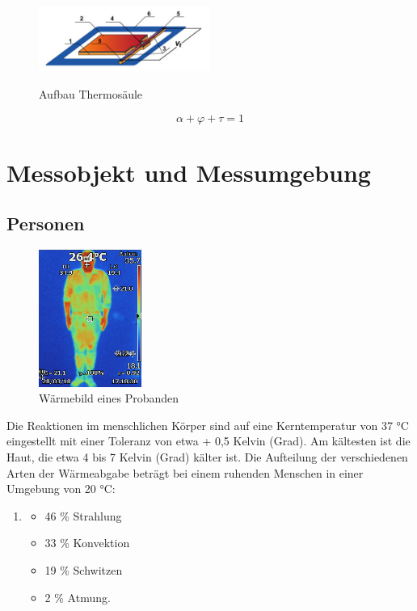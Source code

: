 \begin{figure}[H]
	\centering
	\includegraphics[width=0.5\textwidth]
	{fig/Mems_Thermopile.PNG}
	\caption[Aufbau Thermosäule]{Aufbau Thermosäule} \protect\cite{AMG8834}
	\label{fig:AufbauThermo}
\end{figure}

\begin{equation}
\label{eq4}
\alpha + \varphi + \tau  = 1
\end{equation}



\section{Messobjekt und Messumgebung}


\subsection{Personen}


\begin{figure}[H]
	\centering
	\includegraphics[width=0.3\textwidth]
	{fig/person_waerme.JPG}
	\caption[Wäermebild eines Probanden]{Wärmebild eines Probanden}
	\label{fig:Waermebild}
\end{figure}

Die Reaktionen im menschlichen Körper sind auf eine Kerntemperatur von 37 °C eingestellt mit einer Toleranz von etwa + 0,5 Kelvin (Grad). Am kältesten ist die Haut, die etwa 4 bis 7 Kelvin (Grad) kälter ist. Die Aufteilung der verschiedenen Arten der Wärmeabgabe beträgt bei einem ruhenden Menschen in einer Umgebung von 20 °C:

\begin{enumerate}
\item 
\begin{itemize}
	\item  46 \% Strahlung
	\item  33 \% Konvektion
	\item  19 \% Schwitzen
	\item   2 \% Atmung.
\end{itemize}
\end{enumerate}	


